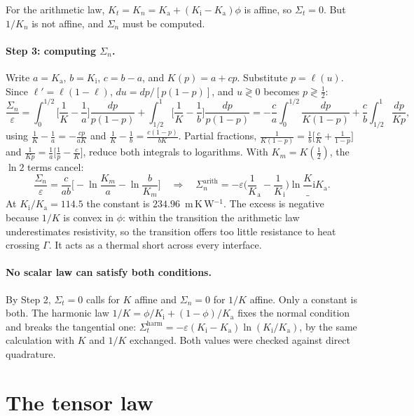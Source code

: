\documentclass[11pt]{article}
\newcommand{\Gam}{\Gamma}
\newcommand{\Ka}{K_{\mathrm a}}
\newcommand{\Ki}{K_{\mathrm i}}
\newcommand{\Kt}{K_{t}}
\newcommand{\Kn}{K_{n}}
\begin{document}
\noindent For the arithmetic law, $\Kt=\Kn=\Ka+(\Ki-\Ka)\phi$ is affine, so
$\Sigma_t=0$. But $1/\Kn$ is not affine, and $\Sigma_n$ must be computed.

\paragraph{Step 3: computing $\Sigma_n$.} Write $a=\Ka$, $b=\Ki$, $c=b-a$, and
$K(p)=a+cp$. Substitute $p=\ell(u)$. Since $\ell'=\ell(1-\ell)$,
$du=dp/[p(1-p)]$, and $u\gtrless0$ becomes $p\gtrless\tfrac12$:
\[
\frac{\Sigma_n}{\varepsilon}
=\int_0^{1/2}\!\Big[\frac1{K}-\frac1a\Big]\frac{dp}{p(1-p)}
+\int_{1/2}^{1}\!\Big[\frac1K-\frac1b\Big]\frac{dp}{p(1-p)}
=-\frac{c}{a}\int_0^{1/2}\!\frac{dp}{K(1-p)}+\frac{c}{b}\int_{1/2}^{1}\!\frac{dp}{Kp},
\]
using $\frac1K-\frac1a=-\frac{cp}{aK}$ and $\frac1K-\frac1b=\frac{c(1-p)}{bK}$.
Partial fractions,
$\frac{1}{K(1-p)}=\frac1b\big[\frac cK+\frac1{1-p}\big]$ and
$\frac{1}{Kp}=\frac1a\big[\frac1p-\frac cK\big]$, reduce both integrals to
logarithms. With $K_m=K(\tfrac12)$, the $\ln2$ terms cancel:
\begin{equation}
\frac{\Sigma_n}{\varepsilon}=\frac{c}{ab}\Big[-\ln\frac{K_m}{a}-\ln\frac{b}{K_m}\Big]
\quad\Longrightarrow\quad
\Sigma_n^{\mathrm{arith}}=-\varepsilon\Big(\frac1\Ka-\frac1\Ki\Big)\ln\frac\Ki\Ka .
\label{eq:Sn}
\end{equation}
At $\Ki/\Ka=114.5$ the constant is $234.96$~m\,K\,W$^{-1}$. The excess is
negative because $1/K$ is convex in $\phi$: within the transition the
arithmetic law underestimates resistivity, so the transition offers too little
resistance to heat crossing $\Gam$. It acts as a thermal short across every
interface.

\paragraph{No scalar law can satisfy both conditions.} By Step 2, $\Sigma_t=0$
calls for $K$ affine and $\Sigma_n=0$ for $1/K$ affine. Only a constant is both.
The harmonic law $1/K=\phi/\Ki+(1-\phi)/\Ka$ fixes the normal condition
and breaks the tangential one:
$\Sigma_t^{\mathrm{harm}}=-\varepsilon(\Ki-\Ka)\ln(\Ki/\Ka)$, by the same
calculation with $K$ and $1/K$ exchanged. Both values were checked against direct
quadrature.

\section{The tensor law}
\label{sec:tensor}
\end{document}
